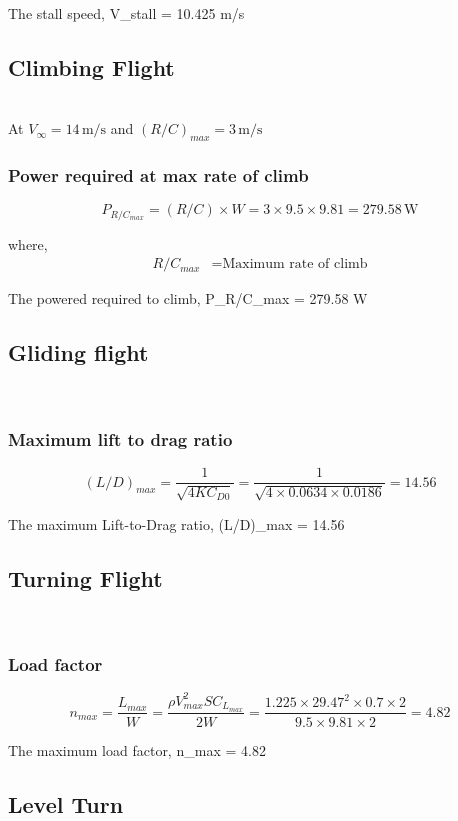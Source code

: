 \documentclass[12 pt]{article}
\begin{document}
{{The stall speed, V_{stall} = 10.425 m/s

\subsection{Climbing Flight}\\

At $V_{\infty} = 14 \, \text{m/s}$ and $(R/C)_{max} = 3 \, \text{m/s}$

\subsubsection{Power required at max rate of climb}
\[ P_{R/C_{max}} = (R/C) \times W = 3 \times 9.5 \times 9.81 = 279.58 \, \text{W} \]

where,
\begin{align*}
R/C_{max}  & = \text{Maximum rate of climb} 
\end{align*}

The powered required to climb, P_{R/C_{max}} = 279.58 W

\subsection{Gliding flight} \\

\subsubsection{Maximum lift to drag ratio}
\[ (L/D)_{max} = \frac{1}{\sqrt{4K C_{D0}}} = \frac{1}{\sqrt{4 \times 0.0634 \times 0.0186}} = 14.56 \]

The maximum Lift-to-Drag ratio, (L/D)_{max} = 14.56

\subsection{Turning Flight} \\

\subsubsection{Load factor}
\[ n_{max} = \frac{L_{max}}{W} = \frac{\rho V_{max}^2 S C_{L_{max}}}{2W} = \frac{1.225 \times 29.47^2 \times 0.7 \times 2}{9.5 \times 9.81 \times 2} = 4.82 \]

The maximum load factor, n_{max} = 4.82

\subsection{Level Turn}\\

}}
\end{document}
